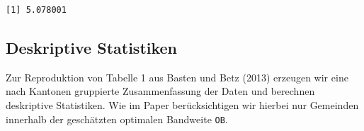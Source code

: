 \documentclass[
  a4paper,
  DIV=11,
  oneside]{scrreprt}
\newenvironment{Shaded}{\begin{snugshade}}{\end{snugshade}}
\newcommand{\AttributeTok}[1]{\textcolor[rgb]{0.40,0.45,0.13}{#1}}
\newcommand{\CommentTok}[1]{\textcolor[rgb]{0.37,0.37,0.37}{#1}}
\newcommand{\DecValTok}[1]{\textcolor[rgb]{0.68,0.00,0.00}{#1}}
\newcommand{\FunctionTok}[1]{\textcolor[rgb]{0.28,0.35,0.67}{#1}}
\newcommand{\NormalTok}[1]{\textcolor[rgb]{0.00,0.23,0.31}{#1}}
\newcommand{\OtherTok}[1]{\textcolor[rgb]{0.00,0.23,0.31}{#1}}
\newcommand{\SpecialCharTok}[1]{\textcolor[rgb]{0.37,0.37,0.37}{#1}}
\newcommand{\StringTok}[1]{\textcolor[rgb]{0.13,0.47,0.30}{#1}}
\begin{document}
\begin{Shaded}
\end{Shaded}

\begin{verbatim}
[1] 5.078001
\end{verbatim}

\hypertarget{deskriptive-statistiken}{%
\subsection{Deskriptive Statistiken}\label{deskriptive-statistiken}}

Zur Reproduktion von Tabelle 1 aus Basten und Betz (2013) erzeugen wir
eine nach Kantonen gruppierte Zusammenfassung der Daten und berechnen
deskriptive Statistiken. Wie im Paper berücksichtigen wir hierbei nur
Gemeinden innerhalb der geschätzten optimalen Bandweite \texttt{OB}.
\end{document}
